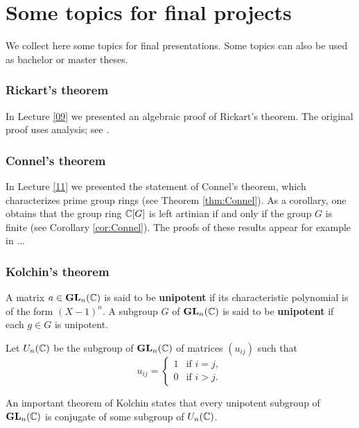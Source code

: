 \chapter*{Some topics for final projects}

\pagestyle{plain}
\fancyhf{}
\fancyfoot[CE,CO]{\leftmark}
\fancyfoot[LE,RO]{\thepage}


We collect here some topics for final presentations. Some topics
can also be used as bachelor or master theses. 

\subsection*{Rickart's theorem}

In Lecture \ref{09} we presented an algebraic proof of Rickart's theorem. 
The original proof uses analysis; see \cite[Chapter II, (6.4)]{MR1838439}. 

\subsection*{Connel's theorem}

In Lecture \ref{11} we presented the statement of Connel's theorem, which
characterizes prime group rings (see Theorem \ref{thm:Connel}). 
As a corollary, one obtains 
that the group ring $\mathbb{C}[G]$ is left artinian if and only if the group
$G$ is finite (see Corollary \ref{cor:Connel}). The proofs of these 
results appear for example in ...

\subsection*{Kolchin's theorem}

A matrix $a\in\mathbf{GL}_n(\mathbb{C})$ is said to be \textbf{unipotent} 
if its characteristic polynomial is of the form $(X-1)^n$. 
A subgroup $G$ of $\mathbf{GL}_n(\mathbb{C})$ is said to be \textbf{unipotent} if
each $g\in G$ is unipotent. 

Let $U_n(\mathbb{C})$ be the subgroup of $\mathbf{GL}_n(\mathbb{C})$ 
of matrices $(u_{ij})$ such that 
\[
u_{ij}=\begin{cases}
1&\text{if $i=j$},\\
0&\text{if $i>j$}.\end{cases}
\]

An important theorem of Kolchin states that 
every unipotent subgroup of $\mathbf{GL}_n(\mathbb{C})$ is conjugate
of some subgroup of $U_n(\mathbb{C})$. 
